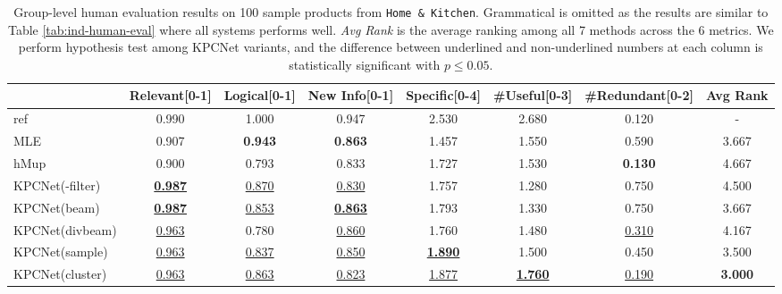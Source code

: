 \begin{table}[htbp]
  \centering
  \small
  \begin{tabular}{l|ccccccc}
    \hline
    {} & Relevant\tiny{[0-1]} & Logical\tiny{[0-1]} & New Info\tiny{[0-1]} & Specific\tiny{[0-4]} & \#Useful\tiny{[0-3]} & \#Redundant\tiny{[0-2]} & Avg Rank \\
    \hline
    ref          &    0.990 &   1.000 &    0.947 &    2.530 &   2.680 &      0.120 & - \\
    \hline
    MLE          &    0.907 &   \textbf{0.943} &    \textbf{0.863} &    1.457 &   1.550 &      0.590 & 3.667 \\
    hMup         &    0.900 &   0.793 &    0.833 &    1.727 &   1.530 &     \textbf{0.130} & 4.667 \\
    \hline
    KPCNet(-filter)  &    \underline{\textbf{0.987}} &   \underline{0.870} &    \underline{0.830} &    1.757 &   1.280 &      0.750 & 4.500 \\
    KPCNet(beam)    &    \underline{\textbf{0.987}} &   \underline{0.853} &    \underline{\textbf{0.863}} &    1.793 &   1.330 &      0.750 & 3.667 \\
    KPCNet(divbeam) &    \underline{0.963} &   0.780 &    \underline{0.860} &    1.760 &   1.480 &  \underline{0.310} & 4.167 \\
    KPCNet(sample)  &    \underline{0.963} &   \underline{0.837} &    \underline{0.850} &    \underline{\textbf{1.890}} &   1.500 &      0.450 & 3.500 \\
    KPCNet(cluster)  &    \underline{0.963} &   \underline{0.863} &    \underline{0.823} &    \underline{1.877} &   \underline{\textbf{1.760}} &      \underline{0.190} & \textbf{3.000} \\
    \hline
    \end{tabular}
  \caption{\label{tab:group-human-eval} Group-level human evaluation results on 100 sample products from \texttt{Home \& Kitchen}. Grammatical is omitted as the results are similar to Table \ref{tab:ind-human-eval} where all systems performs well. \textit{Avg Rank} is the average ranking among all 7 methods across the 6 metrics. We perform hypothesis test among KPCNet variants, and the difference between underlined and non-underlined numbers at each column is statistically significant with $p \leq 0.05$.}
  \end{table}


